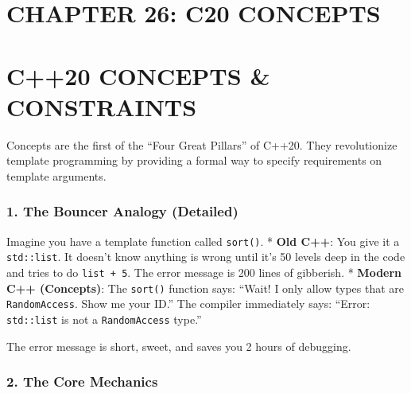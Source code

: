 \hypertarget{chapter-26-c20-concepts}{%
\section{CHAPTER 26: C20 CONCEPTS}\label{chapter-26-c20-concepts}}

\hypertarget{c20-concepts-constraints}{%
\section{C++20 CONCEPTS \& CONSTRAINTS}\label{c20-concepts-constraints}}

Concepts are the first of the ``Four Great Pillars'' of C++20. They
revolutionize template programming by providing a formal way to specify
requirements on template arguments.

\hypertarget{the-bouncer-analogy-detailed}{%
\subsubsection{1. The Bouncer Analogy
(Detailed)}\label{the-bouncer-analogy-detailed}}

Imagine you have a template function called
\passthrough{\lstinline!sort()!}. * \textbf{Old C++}: You give it a
\passthrough{\lstinline!std::list!}. It doesn't know anything is wrong
until it's 50 levels deep in the code and tries to do
\passthrough{\lstinline!list + 5!}. The error message is 200 lines of
gibberish. * \textbf{Modern C++ (Concepts)}: The
\passthrough{\lstinline!sort()!} function says: ``Wait! I only allow
types that are \passthrough{\lstinline!RandomAccess!}. Show me your
ID.'' The compiler immediately says: ``Error:
\passthrough{\lstinline!std::list!} is not a
\passthrough{\lstinline!RandomAccess!} type.''

The error message is short, sweet, and saves you 2 hours of debugging.

\hypertarget{the-core-mechanics}{%
\subsubsection{2. The Core Mechanics}\label{the-core-mechanics}}


